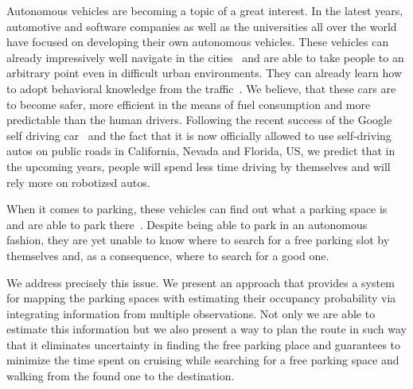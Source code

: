 Autonomous vehicles are becoming a topic of a great interest. In the latest
years, automotive and software companies as well as the universities all over
the world have focused on developing their own autonomous vehicles. These
vehicles can already impressively well navigate in the
cities~\cite{stanley_auto_car,perceprion_drivec_car,lima13,daimler} and are able to
take people to an arbitrary point even in difficult urban environments. They
can already learn how to adopt behavioral knowledge from the
traffic~\cite{behaviour_learning,spinello10:multiclass}. We believe, that
these cars are to become safer, more efficient in the means of fuel
consumption and more predictable than the human drivers. Following the recent
success of the Google self driving car~\cite{markoff2010google} and the fact
that it is now officially allowed to use self-driving autos on public roads in
California, Nevada and Florida, US, we predict that in the upcoming years,
people will spend less time driving by themselves and will rely more on
robotized autos.

When it comes to parking, these vehicles can find out what a parking space is
and are able to park
there~\cite{auto_cars_burgard,auto_parking09,auto_park2_11}. Despite being
able to park in an autonomous fashion, they are yet unable to know where to
search for a free parking slot by themselves and, as a consequence, where to
search for a good one.

We address precisely this issue. We present an approach that provides a system
for mapping the parking spaces with estimating their occupancy probability via
integrating information from multiple observations. Not only we are able to
estimate this information but we also present a way to plan the route in such
way that it eliminates uncertainty in finding the free parking place and
guarantees to minimize the time spent on cruising while searching for a free
parking space and walking from the found one to the destination.

